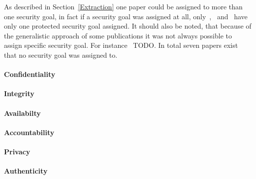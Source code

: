 \documentclass[runningheads]{llncs}
\begin{document}
As described in Section~\ref{Extraction} one paper could be assigned to more than one security goal, in fact if a security goal was assigned at all, 
only~\cite{Zaman20192982},~\cite{MozafariMehr202182} and~\cite{Sarno2020} have only one protected security goal assigned.
It should also be noted, that because of the generalistic approach of some publications it was not always possible to assign specific security goal. For instance~\cite{Fazzinga2020} TODO. 
In total seven papers exist that no security goal was assigned to.
\paragraph{Confidentiality}
\paragraph{Integrity}
\paragraph{Availabilty}
\paragraph{Accountability}
\paragraph{Privacy}
\paragraph{Authenticity}
\end{document}
